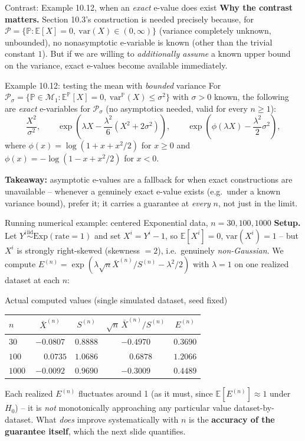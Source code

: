 \documentclass[aspectratio=169,10pt]{beamer}
\newcommand{\E}{\mathbb{E}}
\newcommand{\Pb}{\mathbb{P}}
\newcommand{\calP}{\mathcal{P}}
\begin{document}
\begin{frame}{Contrast: Example 10.12, when an \emph{exact} e-value does exist}
  \textbf{Why the contrast matters.} Section 10.3's construction is needed precisely because, for $\calP=\{\Pb:\E[X]=0,\ \mathrm{var}(X)\in(0,\infty)\}$ (variance completely unknown, unbounded), no nonasymptotic e-variable is known (other than the trivial constant $1$). But if we are willing to \emph{additionally assume} a known upper bound on the variance, exact e-values become available immediately.
  \begin{block}{Example 10.12: testing the mean with \emph{bounded} variance}
    For $\calP_\sigma = \{\Pb\in\mathcal M_1 : \E^{\Pb}[X]=0,\ \mathrm{var}^{\Pb}(X)\leq\sigma^2\}$ with $\sigma>0$ known, the following are \emph{exact} e-variables for $\calP_\sigma$ (no asymptotics needed, valid for every $n\geq1$):
    \[
      \frac{X^2}{\sigma^2}, \qquad \exp\!\left(\lambda X - \frac{\lambda^2}{6}(X^2+2\sigma^2)\right), \qquad \exp\!\left(\phi(\lambda X) - \frac{\lambda^2}{2}\sigma^2\right),
    \]
    where $\phi(x)=\log(1+x+x^2/2)$ for $x\geq0$ and $\phi(x)=-\log(1-x+x^2/2)$ for $x<0$.
  \end{block}
  \textbf{Takeaway:} asymptotic e-values are a fallback for when exact constructions are unavailable -- whenever a genuinely exact e-value exists (e.g.\ under a known variance bound), prefer it; it carries a guarantee at \emph{every} $n$, not just in the limit.
\end{frame}

\begin{frame}{Running numerical example: centered Exponential data, $n=30,100,1000$}
  \textbf{Setup.} Let $Y^i \stackrel{\text{iid}}{\sim} \mathrm{Exp}(\text{rate}=1)$ and set $X^i = Y^i - 1$, so $\E[X^i]=0$, $\mathrm{var}(X^i)=1$ -- but $X^i$ is strongly right-skewed (skewness $=2$), i.e.\ genuinely \emph{non-Gaussian}. We compute $E^{(n)} = \exp(\lambda\sqrt n \bar X^{(n)}/S^{(n)} - \lambda^2/2)$ with $\lambda=1$ on one realized dataset at each $n$:
  \begin{block}{Actual computed values (single simulated dataset, seed fixed)}
    \begin{tabular}{@{}lcccc@{}}
      \toprule
      $n$ & $\bar X^{(n)}$ & $S^{(n)}$ & $\sqrt n\,\bar X^{(n)}/S^{(n)}$ & $E^{(n)}$ \\
      \midrule
      $30$    & $-0.0807$ & $0.8888$ & $-0.4970$ & $0.3690$ \\
      $100$   & $\phantom{-}0.0735$  & $1.0686$ & $\phantom{-}0.6878$  & $1.2066$ \\
      $1000$  & $-0.0092$ & $0.9690$ & $-0.3009$ & $0.4489$ \\
      \bottomrule
    \end{tabular}
  \end{block}
  Each realized $E^{(n)}$ fluctuates around 1 (as it must, since $\E[E^{(n)}]\approx1$ under $H_0$) -- it is \emph{not} monotonically approaching any particular value dataset-by-dataset. What \emph{does} improve systematically with $n$ is the \textbf{accuracy of the guarantee itself}, which the next slide quantifies.
\end{frame}
\end{document}
